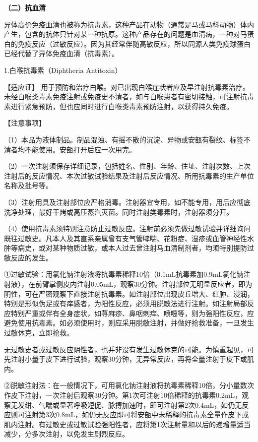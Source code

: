 \textbf{（二）抗血清}

异体高价免疫血清也被称为抗毒素，这种产品在动物（通常是马或马科动物）体内产生，包含的抗体只针对某一种抗原。这种产品存在的问题是血清病，一种对马蛋白的免疫反应（过敏反应）。因为其经常伴随高敏反应，所以同源人类免疫球蛋白已经代替了异体免疫血清（抗毒素）。

1.白喉抗毒素（Diphtheria Antitoxin）

【适应证】
用于预防和治疗白喉。对已出现白喉症状者应及早注射抗毒素治疗。未经白喉类毒素免疫注射或免疫史不清者，如与白喉患者有密切接触，可注射抗毒素进行紧急预防，但也应同时进行白喉类毒素预防注射，以获得持久免疫。

【注意事项】

（1）本品为液体制品。制品混浊、有摇不散的沉淀、异物或安瓿有裂纹、标签不清者均不能使用。安瓿打开后应一次用完。

（2）一次注射须保存详细记录，包括姓名、性别、年龄、住址、注射次数、上次注射后的反应情况、本次过敏试验结果及注射后反应情况、所用抗毒素的生产单位名称及批号等。

（3）注射用具及注射部位应严格消毒。注射器宜专用，如不能专用，用后应彻底洗净处理，最好干烤或高压蒸汽灭菌。同时注射类毒素时，注射器须分开。

（4）使用抗毒素须特别注意防止过敏反应。注射前必须先做过敏试验并详细询问既往过敏史。凡本人及其直系亲属曾有支气管哮喘、花粉症、湿疹或血管神经性水肿等病史，或对某种物质过敏，或本人过去曾注射马血清制剂者，均须特别提防过敏反应的发生。

①过敏试验：用氯化钠注射液将抗毒素稀释10倍（0.1mL抗毒素加0.9mL氯化钠注射液），在前臂掌侧皮内注射0.05mL，观察30分钟。注射部位无明显反应者，即为阴性，可在严密观察下直接注射抗毒素。如注射部位出现皮丘增大、红肿、浸润，特别是形似伪足或有痒感者，为阳性反应，必须用脱敏法进行注射。如注射局部反应特别严重或伴有全身症状，如荨麻疹、鼻咽刺痒、喷嚏等，则为强阳性反应，应避免使用抗毒素。如必须使用时，则应采用脱敏注射，并做好抢救准备，一旦发生过敏休克，立即抢救。

无过敏史者或过敏反应阴性者，也并非没有发生过敏休克的可能。为慎重起见，可先注射小量于皮下进行试验，观察30分钟，无异常反应，再将全量注射于皮下或肌内。

②脱敏注射法：在一般情况下，可用氯化钠注射液将抗毒素稀释10倍，分小量数次作皮下注射，一次注射后观察30分钟。第1次可注射10倍稀释的抗毒素0.2mL，观察无发绀、气喘或显著呼吸短促、脉搏加速时，即可注射第2次0.4mL，如仍无反应则可注射第3次0.8mL，如仍无反应即可将安瓿中未稀释的抗毒素全量作皮下或肌内注射。有过敏史或过敏试验强阳性者，应将第1次注射量和以后的递增量适当减少，分多次注射，以免发生剧烈反应。

